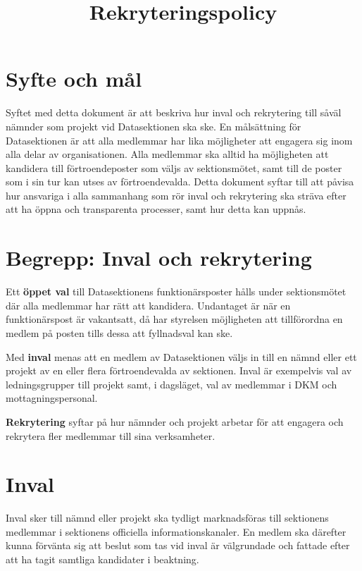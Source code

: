 \documentclass{dgovdoc}
\title{Rekryteringspolicy}
\begin{document}
\maketitle

\section*{Syfte och mål}
Syftet  med  detta dokument  är att beskriva hur inval och rekrytering till såväl nämnder som 
projekt vid Datasektionen ska ske. En målsättning för Datasektionen är att alla medlemmar har lika möjligheter att engagera sig inom alla delar av organisationen. Alla medlemmar ska alltid ha möjligheten att kandidera till förtroendeposter som väljs av sektionsmötet, samt till de poster som i sin tur kan utses av förtroendevalda. Detta dokument syftar till att påvisa hur ansvariga i alla sammanhang som rör inval och rekrytering ska sträva efter att ha öppna och transparenta processer, samt hur detta kan uppnås.

\section*{Begrepp: Inval och rekrytering}
Ett \textbf{öppet val} till  Datasektionens funktionärsposter  hålls  under  sektionsmötet  där  alla medlemmar har rätt att kandidera. Undantaget är när en funktionärspost är vakantsatt, då har 
styrelsen möjligheten att tillförordna en medlem på posten tills dessa att fyllnadsval kan ske. 

Med \textbf{inval} menas att en medlem av Datasektionen väljs in till en nämnd eller ett projekt av en eller flera förtroendevalda av sektionen. Inval är exempelvis val av ledningsgrupper till projekt samt, i dagsläget, val av medlemmar i DKM och mottagningspersonal. 

\textbf{Rekrytering} syftar på hur nämnder och projekt  arbetar  för att  engagera och rekrytera fler medlemmar till sina verksamheter. 

\section*{Inval}
Inval  sker  till  nämnd  eller  projekt  ska  tydligt  marknadsföras  till  sektionens medlemmar  i sektionens  officiella  informationskanaler.  En  medlem  ska  därefter  kunna förvänta  sig  att beslut  som  tas  vid  inval  är  välgrundade  och  fattade  efter  att  ha tagit  samtliga  kandidater  i beaktning. 
\end{document}
